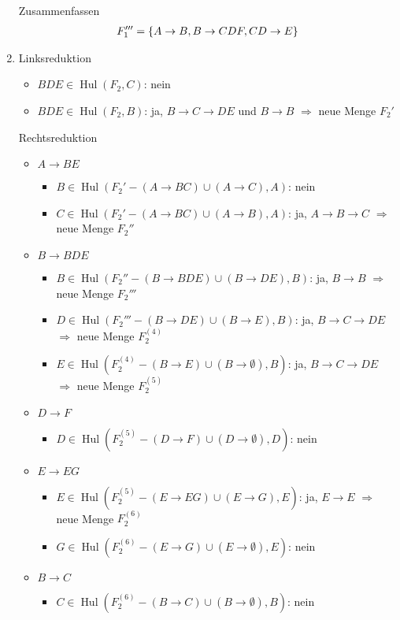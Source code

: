 \documentclass{article}
\DeclareMathOperator{\Hul}{Hul}
\begin{document}
\begin{enumerate}[label=(\alph*)]
		Zusammenfassen
		\begin{align}
			F_1''' = \{A\to B, B\to CDF, CD\to E\} \notag
		\end{align}
		\item Linksreduktion
		\begin{itemize}
			\item $BDE\in\Hul(F_2,C)$: nein
			\item $BDE\in\Hul(F_2,B)$: ja, $B\to C\to DE$ und $B\to B$ $\Rightarrow$ neue Menge $F_2'$
		\end{itemize}
		Rechtsreduktion
		\begin{itemize}
			\item $A\to BE$
			\begin{itemize}
				\item $B\in\Hul(F_2'-(A\to BC) \cup (A\to C), A)$: nein
				\item $C\in\Hul(F_2'-(A\to BC) \cup (A\to B), A)$: ja, $A\to B\to C$ $\Rightarrow$ neue Menge $F_2''$
			\end{itemize}
			\item $B\to BDE$
			\begin{itemize}
				\item $B\in\Hul(F_2''-(B\to BDE) \cup (B\to DE), B)$: ja, $B\to B$ $\Rightarrow$ neue Menge $F_2'''$
				\item $D\in\Hul(F_2'''-(B\to DE) \cup (B\to E), B)$: ja, $B\to C\to DE$ $\Rightarrow$ neue Menge $F_2^{(4)}$
				\item $E\in\Hul(F_2^{(4)}-(B\to E) \cup (B\to \emptyset), B)$: ja, $B\to C\to DE$ $\Rightarrow$ neue Menge $F_2^{(5)}$
			\end{itemize}
			\item $D\to F$
			\begin{itemize}
				\item $D\in\Hul(F_2^{(5)} - (D\to F) \cup (D\to\emptyset), D)$: nein
			\end{itemize}
			\item $E\to EG$
			\begin{itemize}
				\item $E\in\Hul(F_2^{(5)} - (E\to EG) \cup (E\to G), E)$: ja, $E\to E$ $\Rightarrow$ neue Menge $F_2^{(6)}$
				\item $G\in\Hul(F_2^{(6)} - (E\to G) \cup (E\to \emptyset), E)$: nein
			\end{itemize}
			\item $B\to C$
			\begin{itemize}
				\item $C\in\Hul(F_2^{(6)} - (B\to C) \cup (B\to\emptyset), B)$: nein

\end{itemize}
\end{itemize}
\end{enumerate}
\end{document}
